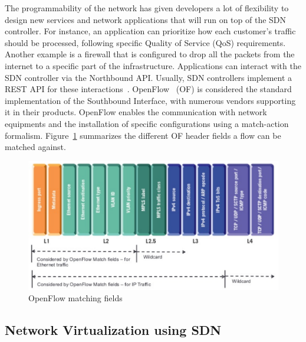 The programmability of the network has given developers a lot of flexibility to design new services and network applications that will run on top of the SDN controller.
For instance, an application can prioritize how each customer's traffic should be processed, following specific Quality of Service (QoS) requirements.
Another example is a firewall that is configured to drop all the packets from the internet to a specific part of the infrastructure.
Applications can interact with the SDN controller via the Northbound API.
Usually, SDN controllers implement a REST API for these interactions~\cite{onos-Berde2014a,opendaylight,floodlight}.
OpenFlow~\cite{Openflow-McKeown2008} (OF) is considered the standard implementation of the Southbound Interface, with numerous vendors supporting it in their products.
OpenFlow enables the communication with network equipments and the installation of specific configurations using a match-action formalism.
Figure~\ref{fig:matching-fields} summarizes the different OF header fields a flow can be matched against.

\begin{figure}[h]
    \centering
    \includegraphics[scale=0.7]{figures/openflow-matchfields.pdf}
    \caption{OpenFlow matching fields~\cite{openflow-matchfields}}
    \label{fig:matching-fields}
\end{figure}

\subsection{Network Virtualization using SDN}
\label{def:netvirt}

